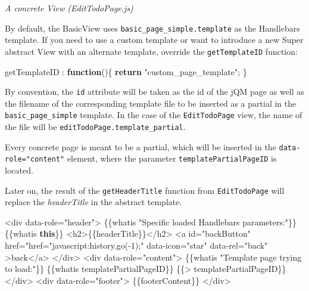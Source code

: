 \documentclass[9pt]{book}
\newenvironment{Shaded}{}{}
\newcommand{\KeywordTok}[1]{\textcolor[rgb]{0.00,0.44,0.13}{\textbf{{#1}}}}
\newcommand{\FloatTok}[1]{\textcolor[rgb]{0.25,0.63,0.44}{{#1}}}
\newcommand{\StringTok}[1]{\textcolor[rgb]{0.25,0.44,0.63}{{#1}}}
\newcommand{\OtherTok}[1]{\textcolor[rgb]{0.00,0.44,0.13}{{#1}}}
\newcommand{\NormalTok}[1]{{#1}}
\begin{document}
\emph{A concrete View (EditTodoPage.js)}

By default, the BasicView uses \texttt{basic\_page\_simple.template} as
the Handlebars template. If you need to use a custom template or want to
introduce a new Super abstract View with an alternate template, override
the \texttt{getTemplateID} function:

\begin{Shaded}
\begin{Highlighting}[]
\NormalTok{getTemplateID : }\KeywordTok{function}\NormalTok{()\{}
  \KeywordTok{return} \StringTok{"custom_page_template"}\NormalTok{;}
\NormalTok{\}}
\end{Highlighting}
\end{Shaded}

By convention, the \texttt{id} attribute will be taken as the id of the
jQM page as well as the filename of the corresponding template file to
be inserted as a partial in the \texttt{basic\_page\_simple} template.
In the case of the \texttt{EditTodoPage} view, the name of the file will
be \texttt{editTodoPage.template\_partial}.

Every concrete page is meant to be a partial, which will be inserted in
the \texttt{data-role="content"} element, where the parameter
\texttt{templatePartialPageID} is located.

Later on, the result of the \texttt{getHeaderTitle} function from
\texttt{EditTodoPage} will replace the \emph{headerTitle} in the
abstract template.

\begin{Shaded}
\begin{Highlighting}[]
\NormalTok{<div data-role=}\StringTok{"header"}\NormalTok{>}
        \NormalTok{\{\{whatis }\StringTok{"Specific loaded Handlebars parameters:"}\NormalTok{\}\}}
        \NormalTok{\{\{whatis }\KeywordTok{this}\NormalTok{\}\}}
        \NormalTok{<h2>\{\{headerTitle\}\}<}\OtherTok{/h2>}
\OtherTok{        <a id="backButton" href="href="javascript:history.go}\FloatTok{(}\OtherTok{-1}\FloatTok{)}\OtherTok{;" data-icon="star" data-rel="back" >back</a}\NormalTok{>}
    \NormalTok{<}\OtherTok{/div>}
\OtherTok{    <div data-role="content">}
\OtherTok{        \{\{whatis "Template page trying to load:"\}\}}
\OtherTok{        \{\{whatis templatePartialPageID\}\}}
\OtherTok{        \{\{> templatePartialPageID\}\}}
\OtherTok{    </div}\NormalTok{>}
    \NormalTok{<div data-role=}\StringTok{"footer"}\NormalTok{>}
        \NormalTok{\{\{footerContent\}\}}
\NormalTok{<}\OtherTok{/div>}
\end{Highlighting}
\end{Shaded}
\end{document}
